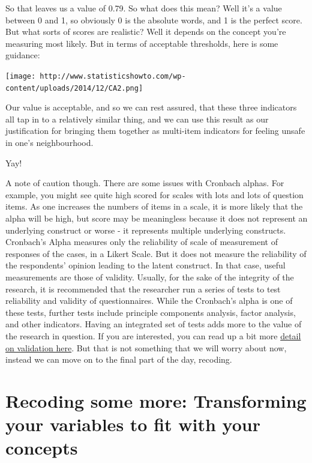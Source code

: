 \documentclass[]{book}
\theoremstyle{definition}
\theoremstyle{definition}
\theoremstyle{definition}
\theoremstyle{remark}
\begin{document}
So that leaves us a value of 0.79. So what does this mean? Well it's a
value between 0 and 1, so obviously 0 is the absolute words, and 1 is
the perfect score. But what sorts of scores are realistic? Well it
depends on the concept you're measuring most likely. But in terms of
acceptable thresholds, here is some guidance:

\texttt{[image: http://www.statisticshowto.com/wp-content/uploads/2014/12/CA2.png]}

Our value is acceptable, and so we can rest assured, that these three
indicators all tap in to a relatively similar thing, and we can use this
result as our justification for bringing them together as multi-item
indicators for feeling unsafe in one's neighbourhood.

Yay!

A note of caution though. There are some issues with Cronbach alphas.
For example, you might see quite high scored for scales with lots and
lots of question items. As one increases the numbers of items in a
scale, it is more likely that the alpha will be high, but score may be
meaningless because it does not represent an underlying construct or
worse - it represents multiple underlying constructs. Cronbach's Alpha
measures only the reliability of scale of measurement of responses of
the cases, in a Likert Scale. But it does not measure the reliability of
the respondents' opinion leading to the latent construct. In that case,
useful measurements are those of validity. Usually, for the sake of the
integrity of the research, it is recommended that the researcher run a
series of tests to test reliability and validity of questionnaires.
While the Cronbach's alpha is one of these tests, further tests include
principle components analysis, factor analysis, and other indicators.
Having an integrated set of tests adds more to the value of the research
in question. If you are interested, you can read up a bit more
\href{http://onlinelibrary.wiley.com.manchester.idm.oclc.org/doi/10.1002/9780470024522.ch5/pdf}{detail
on validation here}. But that is not something that we will worry about
now, instead we can move on to the final part of the day, recoding.

\hypertarget{recoding-some-more-transforming-your-variables-to-fit-with-your-concepts}{%
\section{Recoding some more: Transforming your variables to fit with
your
concepts}\label{recoding-some-more-transforming-your-variables-to-fit-with-your-concepts}}
\end{document}
